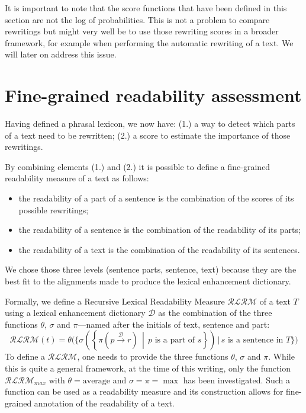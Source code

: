 \documentclass[a4paper, 11pt, onepage]{scrreprt}
\newcommand\maps[1]{\xrightarrow{\mathcal{#1}}}
\newcommand\suchthat{\, \middle| \,}
\begin{document}
It is important to note that the score functions that have been
defined in this section are not the log of probabilities. This is not
a problem to compare rewritings but might very well be to use those
rewriting scores in a broader framework, for example when performing
the automatic rewriting of a text. We will later on address this
issue.

\section{Fine-grained readability assessment}
\label{sec:fine-grain-read}

Having defined a phrasal lexicon, we now have: (1.) a way to detect
which parts of a text need to be rewritten; (2.) a score to estimate
the importance of those rewritings.

By combining elements (1.) and (2.) it is possible to define a
fine-grained readability measure of a text as follows:

\begin{itemize}
\item the readability of a part of a sentence is the combination of
  the scores of its possible rewritings;
\item the readability of a sentence is the combination of the
  readability of its parts;
\item the readability of a text is the combination of the readability
  of its sentences.
\end{itemize}

We chose those three levels (sentence parts, sentence, text) because
they are the best fit to the alignments made to produce the lexical
enhancement dictionary.

Formally, we define a Recursive Lexical Readability Measure
$\mathcal{RLRM}$ of a text $T$ using a lexical enhancement dictionary
$\mathcal{D}$ as the combination of the three functions $\theta$,
$\sigma$ and $\pi$—named after the initials of text, sentence and
part:
\[
\mathcal{RLRM}(t) = \theta\Bigg(\Bigg\{ \sigma \left(\left\{ \pi(p
    \maps{D} r) \suchthat \text{$p$ is a part of $s$}\right\}\right)
\,\Bigg|\, \text{$s$ is a sentence in $T$} \Bigg\}\Bigg)
\]
To define a $\mathcal{RLRM}$, one needs to provide the three functions
$\theta$, $\sigma$ and $\pi$. While this is quite a general framework,
at the time of this writing, only the function $\mathcal{RLRM}_{max}$
with $\theta = \text{average}$ and $\sigma = \pi = \max$ has been
investigated. Such a function can be used as a readability measure and
its construction allows for fine-grained annotation of the readability
of a text.
\end{document}

